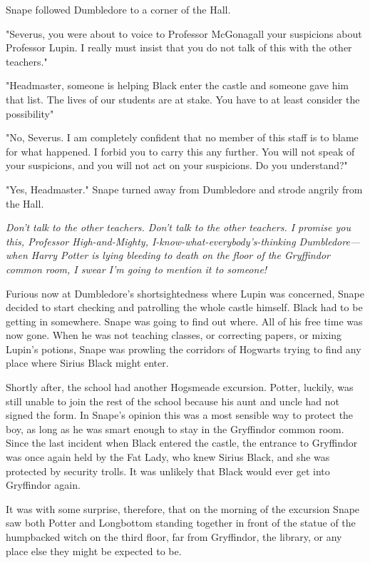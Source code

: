 Snape followed Dumbledore to a corner of the Hall.

"Severus, you were about to voice to Professor McGonagall your suspicions about Professor Lupin. I really must insist that you do not talk of this with the other teachers."

"Headmaster, someone is helping Black enter the castle and someone gave him that list. The lives of our students are at stake. You have to at least consider the possibility{\el}"

"No, Severus. I am completely confident that no member of this staff is to blame for what happened. I forbid you to carry this any further. You will not speak of your suspicions, and you will not act on your suspicions. Do you understand?"

"Yes, Headmaster." Snape turned away from Dumbledore and strode angrily from the Hall.

\emph{Don't talk to the other teachers. Don't talk to the other teachers. I promise you this, Professor High-and-Mighty, I-know-what-everybody's-thinking Dumbledore—when Harry Potter is lying bleeding to death on the floor of the Gryffindor common room, I swear I'm going to mention it to someone!}

Furious now at Dumbledore's shortsightedness where Lupin was concerned, Snape decided to start checking and patrolling the whole castle himself. Black had to be getting in somewhere. Snape was going to find out where. All of his free time was now gone. When he was not teaching classes, or correcting papers, or mixing Lupin's potions, Snape was prowling the corridors of Hogwarts trying to find any place where Sirius Black might enter.

Shortly after, the school had another Hogsmeade excursion. Potter, luckily, was still unable to join the rest of the school because his aunt and uncle had not signed the form. In Snape's opinion this was a most sensible way to protect the boy, as long as he was smart enough to stay in the Gryffindor common room. Since the last incident when Black entered the castle, the entrance to Gryffindor was once again held by the Fat Lady, who knew Sirius Black, and she was protected by security trolls. It was unlikely that Black would ever get into Gryffindor again.

It was with some surprise, therefore, that on the morning of the excursion Snape saw both Potter and Longbottom standing together in front of the statue of the humpbacked witch on the third floor, far from Gryffindor, the library, or any place else they might be expected to be.

